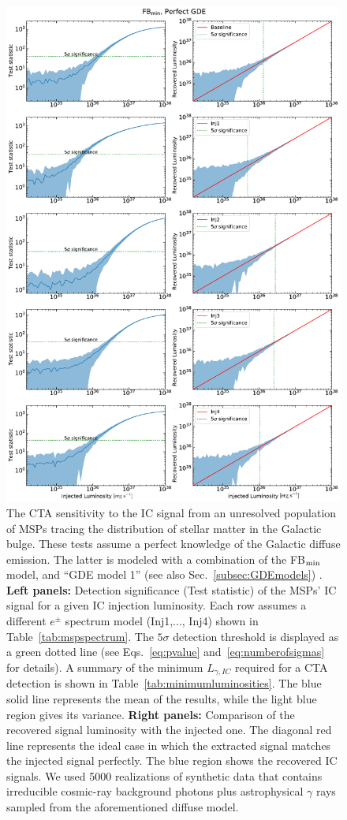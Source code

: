 \documentclass[doublespace,nopageskip]{VTthesis} %
\begin{document}
\begin{figure}
    \begin{center}
    \includegraphics[scale = 0.41]{Figures/CTA/all-TS-mis-False-Fermi-min-True.pdf}
    \caption{The CTA sensitivity to the IC signal from an unresolved population of MSPs tracing the distribution of stellar matter in the Galactic bulge. These tests assume a perfect knowledge of the Galactic diffuse emission. The latter is modeled with a combination of the FB$_{\rm min}$ model, and ``GDE model 1'' (see also Sec.~\ref{subsec:GDEmodels})  
    . \textbf{Left panels:} Detection significance (Test statistic) of the MSPs' IC signal for a given IC injection luminosity. Each row assumes a different $e^\pm$ spectrum model (Inj1,..., Inj4) shown in Table~\ref{tab:mspspectrum}. The $5\sigma$ detection threshold is displayed as a green dotted line (see Eqs.~\ref{eq:pvalue} and~\ref{eq:numberofsigmas} for details). A summary of the minimum $L_{\gamma,IC}$ required for a CTA detection is shown in Table~\ref{tab:minimumluminosities}.  The blue solid line represents the mean of the results, while the light blue region gives its variance. \textbf{Right panels:} Comparison of the recovered signal luminosity with the injected one. The diagonal red line represents the ideal case in which the extracted signal matches the injected signal perfectly. The blue region shows the recovered IC signals. We used  5000 realizations of synthetic data that contains irreducible cosmic-ray background photons plus astrophysical $\gamma$ rays sampled from the aforementioned diffuse model. 
}
\end{center}
\end{figure}
\end{document}
